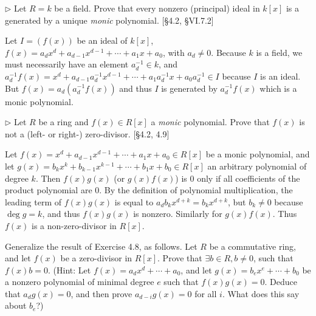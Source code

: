 \begin{problem}
	$\triangleright$ Let $R = k$ be a field. Prove that every nonzero (principal) ideal in $k[x]$ is a generated by a unique \emph{monic} polynomial. [\S 4.2, \S VI.7.2]
\end{problem}

\begin{solution}
	Let $I = (f(x))$ be an ideal of $k[x]$, $f(x) = a_d x^d + a_{d-1}x^{d-1}+\cdots+a_1x + a_0$, with $a_d \neq 0$. Because $k$ is a field, we must necessarily have an element $a_d^{-1} \in k$, and $a_d^{-1}f(x) = x^d + a_{d-1}a_d^{-1}x^{d-1}+\cdots+a_1a_d^{-1}x + a_0a_d^{-1} \in I$ because $I$ is an ideal. But $f(x) = a_d (a_d^{-1}f(x))$ and thus $I$ is generated by $a_d^{-1} f(x)$ which is a monic polynomial.
\end{solution}

\begin{problem}
	$\triangleright$ Let $R$ be a ring and $f(x) \in R[x]$ a \emph{monic} polynomial. Prove that $f(x)$ is not a (left- or right-) zero-divisor. [\S 4.2, 4.9]
\end{problem}

\begin{solution}
	Let $f(x) = x^d + a_{d-1} x^{d-1} + \cdots + a_1 x + a_0 \in R[x]$ be a monic polynomial, and let $g(x) = b_k x^k + b_{k-1} x^{k-1} + \cdots + b_1 x + b_0 \in R[x]$ an arbitrary polynomial of degree $k$. Then $f(x)g(x)$ (or $g(x)f(x)$) is $0$ only if all coefficients of the product polynomial are $0$. By the definition of polynomial multiplication, the leading term of $f(x)g(x)$ is equal to $a_d b_k x^{d+k} = b_k x^{d+k}$, but $b_k \neq 0$ because $\deg g = k$, and thus $f(x)g(x)$ is nonzero. Similarly for $g(x)f(x)$. Thus $f(x)$ is a non-zero-divisor in $R[x]$.
\end{solution}

\begin{problem}
	Generalize the result of Exercise 4.8, as follows. Let $R$ be a commutative ring, and let $f(x)$ be a zero-divisor in $R[x]$. Prove that $\exists b \in R, b \neq 0$, such that $f(x)b = 0$. (Hint: Let $f(x) = a_d x^d + \cdots + a_0$, and let $g(x) = b_e x^e + \cdots + b_0$ be a nonzero polynomial of minimal degree $e$ such that $f(x)g(x) = 0$. Deduce that $a_d g(x) = 0$, and then prove $a_{d-i}g(x) = 0$ for all $i$. What does this say about $b_e$?)
\end{problem}


